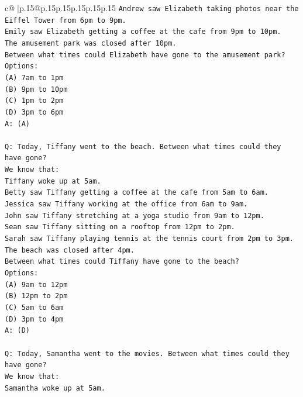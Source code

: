 \documentclass{article}
\begin{document}
{\begin{supertabular}{c@{$\;$}|p{.15\linewidth}@{}p{.15\linewidth}p{.15\linewidth}p{.15\linewidth}p{.15\linewidth}p{.15\linewidth}}
{{{\texttt{Andrew saw Elizabeth taking photos near the Eiffel Tower from 6pm to 9pm.} \\
\texttt{Emily saw Elizabeth getting a coffee at the cafe from 9pm to 10pm.} \\
\texttt{The amusement park was closed after 10pm.} \\
\texttt{Between what times could Elizabeth have gone to the amusement park?} \\
\texttt{Options:} \\
\texttt{(A) 7am to 1pm} \\
\texttt{(B) 9pm to 10pm} \\
\texttt{(C) 1pm to 2pm} \\
\texttt{(D) 3pm to 6pm} \\
\texttt{A: (A)} \\
\\ 
\texttt{Q: Today, Tiffany went to the beach. Between what times could they have gone?} \\
\texttt{We know that:} \\
\texttt{Tiffany woke up at 5am.} \\
\texttt{Betty saw Tiffany getting a coffee at the cafe from 5am to 6am.} \\
\texttt{Jessica saw Tiffany working at the office from 6am to 9am.} \\
\texttt{John saw Tiffany stretching at a yoga studio from 9am to 12pm.} \\
\texttt{Sean saw Tiffany sitting on a rooftop from 12pm to 2pm.} \\
\texttt{Sarah saw Tiffany playing tennis at the tennis court from 2pm to 3pm.} \\
\texttt{The beach was closed after 4pm.} \\
\texttt{Between what times could Tiffany have gone to the beach?} \\
\texttt{Options:} \\
\texttt{(A) 9am to 12pm} \\
\texttt{(B) 12pm to 2pm} \\
\texttt{(C) 5am to 6am} \\
\texttt{(D) 3pm to 4pm} \\
\texttt{A: (D)} \\
\\ 
\texttt{Q: Today, Samantha went to the movies. Between what times could they have gone?} \\
\texttt{We know that:} \\
\texttt{Samantha woke up at 5am.} \\
}}}
\end{supertabular}}
\end{document}
